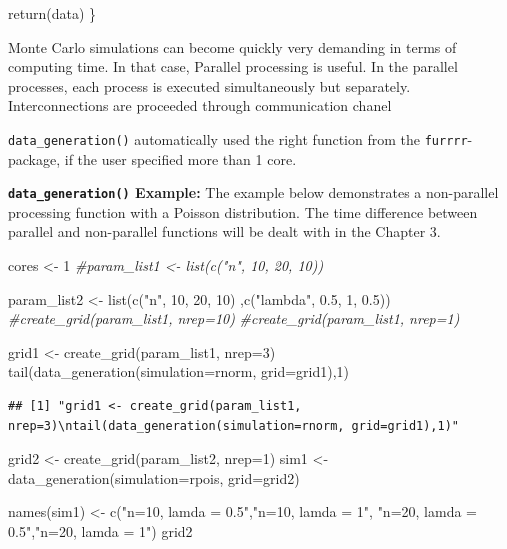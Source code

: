 \documentclass[11pt,a4paper]{article}
\newenvironment{Shaded}{\begin{snugshade}}{\end{snugshade}}
\newcommand{\AttributeTok}[1]{\textcolor[rgb]{0.77,0.63,0.00}{#1}}
\newcommand{\CommentTok}[1]{\textcolor[rgb]{0.56,0.35,0.01}{\textit{#1}}}
\newcommand{\DecValTok}[1]{\textcolor[rgb]{0.00,0.00,0.81}{#1}}
\newcommand{\FloatTok}[1]{\textcolor[rgb]{0.00,0.00,0.81}{#1}}
\newcommand{\FunctionTok}[1]{\textcolor[rgb]{0.00,0.00,0.00}{#1}}
\newcommand{\NormalTok}[1]{#1}
\newcommand{\OtherTok}[1]{\textcolor[rgb]{0.56,0.35,0.01}{#1}}
\newcommand{\StringTok}[1]{\textcolor[rgb]{0.31,0.60,0.02}{#1}}
\begin{document}
\begin{Shaded}
\begin{Highlighting}[]
  \FunctionTok{return}\NormalTok{(data)}
\NormalTok{\}}
\end{Highlighting}
\end{Shaded}

Monte Carlo simulations can become quickly very demanding in terms of
computing time. In that case, Parallel processing is useful. In the
parallel processes, each process is executed simultaneously but
separately. Interconnections are proceeded through communication
chanel\autocite{Czech_2017}

\texttt{data\_generation()} automatically used the right function from
the \texttt{furrrr}-package, if the user specified more than 1 core.

\textbf{\texttt{data\_generation()} Example:} The example below
demonstrates a non-parallel processing function with a Poisson
distribution. The time difference between parallel and non-parallel
functions will be dealt with in the Chapter 3.

\begin{Shaded}
\begin{Highlighting}[]
\NormalTok{cores }\OtherTok{\textless{}{-}} \DecValTok{1}
\CommentTok{\#param\_list1 \textless{}{-} list(c("n", 10, 20, 10))}

\NormalTok{param\_list2 }\OtherTok{\textless{}{-}} \FunctionTok{list}\NormalTok{(}\FunctionTok{c}\NormalTok{(}\StringTok{"n"}\NormalTok{, }\DecValTok{10}\NormalTok{, }\DecValTok{20}\NormalTok{, }\DecValTok{10}\NormalTok{)}
\NormalTok{                  ,}\FunctionTok{c}\NormalTok{(}\StringTok{"lambda"}\NormalTok{, }\FloatTok{0.5}\NormalTok{, }\DecValTok{1}\NormalTok{, }\FloatTok{0.5}\NormalTok{))}
\CommentTok{\#create\_grid(param\_list1, nrep=10)}
\CommentTok{\#create\_grid(param\_list1, nrep=1)}

\StringTok{\textquotesingle{}grid1 \textless{}{-} create\_grid(param\_list1, nrep=3)}
\StringTok{tail(data\_generation(simulation=rnorm, grid=grid1),1)\textquotesingle{}}
\end{Highlighting}
\end{Shaded}

\begin{verbatim}
## [1] "grid1 <- create_grid(param_list1, nrep=3)\ntail(data_generation(simulation=rnorm, grid=grid1),1)"
\end{verbatim}

\begin{Shaded}
\begin{Highlighting}[]
\NormalTok{grid2 }\OtherTok{\textless{}{-}} \FunctionTok{create\_grid}\NormalTok{(param\_list2, }\AttributeTok{nrep=}\DecValTok{1}\NormalTok{)}
\NormalTok{sim1 }\OtherTok{\textless{}{-}} \FunctionTok{data\_generation}\NormalTok{(}\AttributeTok{simulation=}\NormalTok{rpois, }\AttributeTok{grid=}\NormalTok{grid2)}


\FunctionTok{names}\NormalTok{(sim1) }\OtherTok{\textless{}{-}} \FunctionTok{c}\NormalTok{(}\StringTok{"n=10, lamda = 0.5"}\NormalTok{,}\StringTok{"n=10, lamda = 1"}\NormalTok{,}
                 \StringTok{"n=20, lamda = 0.5"}\NormalTok{,}\StringTok{"n=20, lamda = 1"}\NormalTok{)}
\NormalTok{grid2}
\end{Highlighting}
\end{Shaded}
\end{document}
